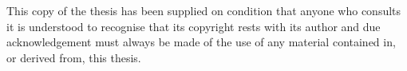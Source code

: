 
This copy of the thesis has been supplied on condition that anyone who consults it is understood to recognise that its copyright rests with its author and due acknowledgement must always be made of the use of any material contained in, or derived from, this thesis.